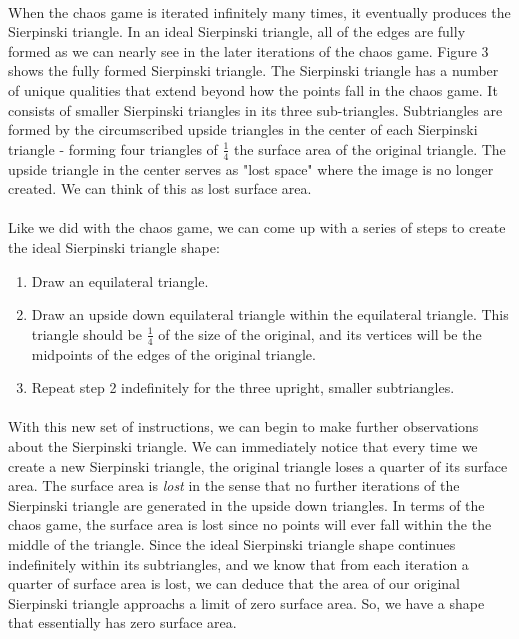 \documentclass{article}
\begin{document}
\paragraph{}
When the chaos game is iterated infinitely many times, it eventually produces the Sierpinski triangle. In an ideal Sierpinski triangle, all of the edges are fully formed as we can nearly see in the later iterations of the chaos game. Figure 3 shows the fully formed Sierpinski triangle. The Sierpinski triangle has a number of unique qualities that extend beyond how the points fall in the chaos game. It consists of smaller Sierpinski triangles in its three sub-triangles. Subtriangles are formed by the circumscribed upside triangles in the center of each Sierpinski triangle - forming four triangles of \(\frac{1}{4}\) the surface area of the original triangle. The upside triangle in the center serves as "lost space" where the image is no longer created. We can think of this as lost surface area.
\paragraph{}
Like we did with the chaos game, we can come up with a series of steps to create the ideal Sierpinski triangle shape:
\begin{enumerate}
    \item Draw an equilateral triangle.
    \item Draw an upside down equilateral triangle within the equilateral triangle. This triangle should be \(\frac{1}{4}\) of the size of the original, and its vertices will be the midpoints of the edges of the original triangle.
    \item Repeat step 2 indefinitely for the three upright, smaller subtriangles.
\end{enumerate}
\paragraph{}
With this new set of instructions, we can begin to make further observations about the Sierpinski triangle. We can immediately notice that every time we create a new Sierpinski triangle, the original triangle loses a quarter of its surface area. The surface area is \textit{lost} in the sense that no further iterations of the Sierpinski triangle are generated in the upside down triangles. In terms of the chaos game, the surface area is lost since no points will ever fall within the the middle of the triangle. Since the ideal Sierpinski triangle shape continues indefinitely within its subtriangles, and we know that from each iteration a quarter of surface area is lost, we can deduce that the area of our original Sierpinski triangle approachs a limit of zero surface area. So, we have a shape that essentially has zero surface area.
\end{document}
